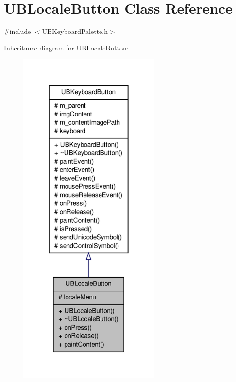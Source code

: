 \hypertarget{class_u_b_locale_button}{\section{U\-B\-Locale\-Button Class Reference}
\label{de/d9c/class_u_b_locale_button}
}


{\ttfamily \#include $<$U\-B\-Keyboard\-Palette.\-h$>$}



Inheritance diagram for U\-B\-Locale\-Button\-:
\nopagebreak
\begin{figure}[H]
\begin{center}
\leavevmode
\includegraphics[width=202pt]{da/dc0/class_u_b_locale_button__inherit__graph}
\end{center}
\end{figure}


